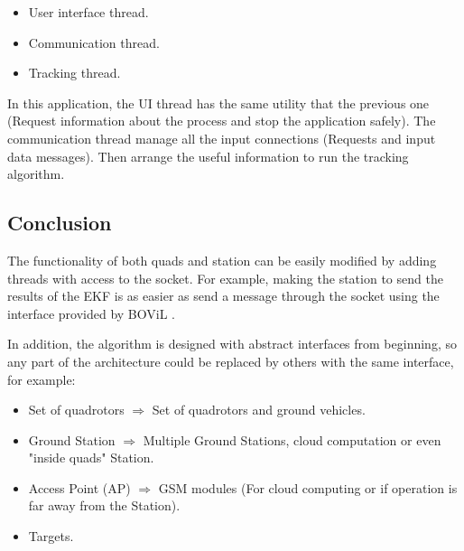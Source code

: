 	\begin{itemize}
		\item User interface thread.
		\item Communication thread.
		\item Tracking thread.
	\end{itemize}

	In this application, the UI thread has the same utility that the previous one (Request information about the process and stop the application safely). The communication thread manage all the input connections (Requests and input data messages). Then arrange the useful information to run the tracking algorithm.
	
\subsection{Conclusion}
The functionality of both quads and station can be easily modified by adding threads with access to the socket. For example, making the station to send the results of the EKF is as easier as send a message through the socket using the interface provided by BOViL \cite{BOViL}. 

In addition, the algorithm is designed with abstract interfaces from beginning, so any part of the architecture could be replaced by others with the same interface, for example:

\begin{itemize}
  \item Set of quadrotors $\Longrightarrow$ Set of quadrotors and ground vehicles.
  \item Ground Station $\Longrightarrow$ Multiple Ground Stations, cloud computation \cite{Cloud_computing} or even "inside quads" Station.
  \item Access Point (AP) $\Longrightarrow$ GSM modules (For cloud computing or if operation is far away from the Station).
  \item Targets.
\end{itemize}


